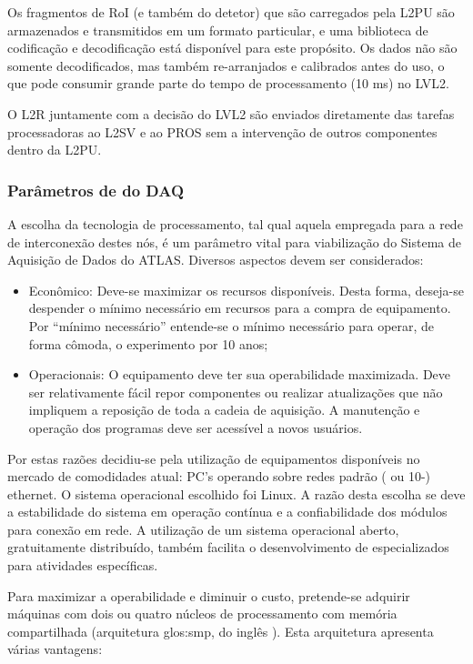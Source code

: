 Os fragmentos de RoI (e também do detetor) que são carregados pela L2PU são
armazenados e transmitidos em um formato particular, e uma biblioteca de
codificação e decodificação \cite{aa:ef-urd, aa:ef-ooad} está disponível para
este propósito. Os dados não são somente decodificados, mas também
re-arranjados e calibrados antes do uso, o que pode consumir grande parte do
tempo de processamento (10 ms) no LVL2.

O L2R juntamente com a decisão do LVL2 são enviados diretamente das tarefas
processadoras ao L2SV e ao PROS sem a intervenção de outros componentes dentro
da L2PU.

\subsubsection{Parâmetros de  do DAQ}

A escolha da tecnologia de processamento, tal qual aquela empregada para a
rede de interconexão destes nós, é um parâmetro vital para viabilização do
Sistema de Aquisição de Dados do ATLAS. Diversos aspectos devem ser
considerados:

\begin{itemize}
\item Econômico: Deve-se maximizar os recursos disponíveis. Desta forma,
deseja-se despender o mínimo necessário em recursos para a compra de
equipamento. Por ``mínimo necessário'' entende-se o mínimo necessário para
operar, de forma cômoda, o experimento por 10 anos;

\item Operacionais: O equipamento deve ter sua operabilidade maximizada. Deve
ser relativamente fácil repor componentes ou realizar atualizações que não
impliquem a reposição de toda a cadeia de aquisição. A manutenção e operação
dos programas deve ser acessível a novos usuários.
\end{itemize}

Por estas razões decidiu-se pela utilização de equipamentos disponíveis no
mercado de comodidades atual: PC's operando sobre redes padrão (
ou 10-) ethernet. O sistema operacional escolhido foi Linux. A
razão desta escolha se deve a estabilidade do sistema em operação contínua e a
confiabilidade dos módulos para conexão em rede. A utilização de um sistema
operacional aberto, gratuitamente distribuído, também facilita o
desenvolvimento de  especializados para atividades específicas.

Para maximizar a operabilidade e diminuir o custo, pretende-se adquirir
máquinas com dois ou quatro núcleos de processamento com memória compartilhada
(arquitetura \gls{glos:smp}, do inglês ). Esta
arquitetura apresenta várias vantagens:

